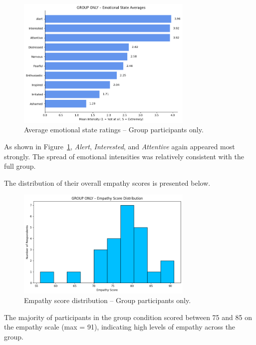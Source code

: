 \begin{figure}[H]
    \centering
    \includegraphics[width=0.75\textwidth]{../../Figures/emotional-post-grp.png}
    \caption{Average emotional state ratings – Group participants only.}
    \label{fig:emotional_post_group}
\end{figure}

As shown in Figure~\ref{fig:emotional_post_group}, \textit{Alert}, \textit{Interested}, and \textit{Attentive} again appeared most strongly. The spread of emotional intensities was relatively consistent with the full group.

The distribution of their overall empathy scores is presented below.

\begin{figure}[H]
    \centering
    \includegraphics[width=0.75\textwidth]{../../Figures/empathy-score-post-grp.png}
    \caption{Empathy score distribution – Group participants only.}
    \label{fig:empathy_group_post}
\end{figure}

The majority of participants in the group condition scored between 75 and 85 on the empathy scale (max = 91), indicating high levels of empathy across the group.

